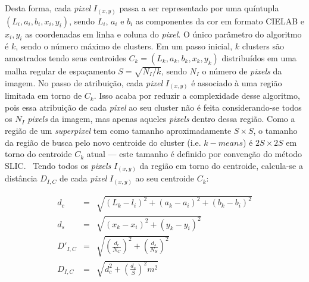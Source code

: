 Desta forma, cada \textit{pixel} $I_{(x,y)}$ passa a ser representado por uma
quíntupla $(L_i, a_i, b_i, x_i, y_i)$, sendo $L_i$, $a_i$ e $b_i$ as
componentes da cor em formato CIELAB e $x_i, y_i$ as coordenadas em
linha e coluna do \textit{pixel}. O único parâmetro do algoritmo é $k$, sendo o
número máximo de clusters. Em um passo inicial, $k$ clusters são
amostrados tendo seus centroides $C_k = (L_k, a_k, b_k, x_k, y_k)$
distribuídos em uma malha regular de espaçamento $S = \sqrt{N_I/k}$,
sendo $N_I$ o número de \textit{pixels} da imagem. No passo de atribuição, cada
\textit{pixel} $I_{(x,y)}$ é associado à uma região limitada em torno de
$C_k$. Isso acaba por reduzir a complexidade desse algoritmo, pois
essa atribuição de cada \textit{pixel} ao seu cluster não é feita
considerando-se todos os $N_I$ \textit{pixels} da imagem, mas apenas aqueles
\textit{pixels} dentro dessa região. Como a região de um \textit{superpixel} tem como
tamanho aproximadamente $S \times S$, o tamanho da região de busca
pelo novo centroide do cluster (i.e. $k-means$) é $2S \times 2S$ em
torno do centroide $C_k$ atual --- este tamanho é definido por
convenção do método SLIC.~\cite{slic} Tendo todos os \textit{pixels}
$I_{(x,y)}$ da região em torno do centroide, calcula-se a distância
$D_{I,C}$ de cada \textit{pixel} $I_{(x,y)}$ ao seu centroide $C_k$:

\begin{eqnarray}
  d_c      & = & \sqrt{(L_k - l_i)^2 + (a_k - a_i)^2 + (b_k - b_i)^2} \\
  d_s      & = & \sqrt{(x_k - x_i)^2 + (y_k - y_i)^2} \\
  D'_{I,C}  & = & \sqrt{(\frac{d_c}{N_C})^2 + (\frac{d_s}{N_S})^2} \\
  D_{I,C}   & = & \sqrt{d_c^2 + (\frac{d_s}{S})^2 m^2}
\end{eqnarray}

